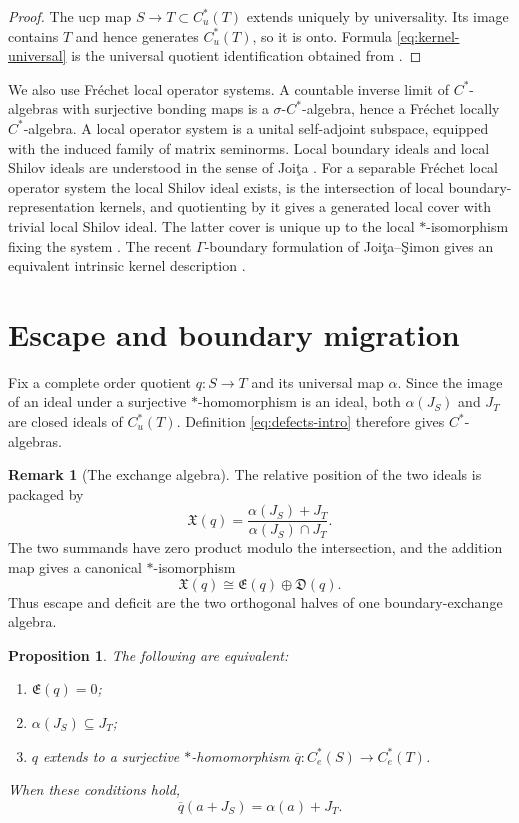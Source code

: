 \documentclass[11pt,a4paper]{amsart}
\theoremstyle{plain}
\newtheorem{proposition}[theorem]{Proposition}
\theoremstyle{definition}
\newtheorem{remark}[theorem]{Remark}
\newcommand{\Cu}{C_u^*}
\newcommand{\Ce}{C_e^*}
\newcommand{\Esc}{\mathfrak E}
\newcommand{\Def}{\mathfrak D}
\begin{document}
\begin{proof}
The ucp map $S\to T\subset\Cu(T)$ extends uniquely by universality.  Its image contains $T$ and
hence generates $\Cu(T)$, so it is onto.  Formula \eqref{eq:kernel-universal} is the universal
quotient identification obtained from \cite[Theorem~3.7 and Corollary~3.9]{KPTT2013}.
\end{proof}

We also use Fr\'echet local operator systems.  A countable inverse limit of $C^*$-algebras with
surjective bonding maps is a $\sigma$-$C^*$-algebra, hence a Fr\'echet locally $C^*$-algebra.
A local operator system is a unital self-adjoint subspace, equipped with the induced family of
matrix seminorms.  Local boundary ideals and local Shilov ideals are understood in the sense of
Joi\c{t}a \cite{Joita2025}.  For a separable Fr\'echet local operator system the local Shilov ideal
exists, is the intersection of local boundary-representation kernels, and quotienting by it gives
a generated local cover with trivial local Shilov ideal.  The latter cover is unique up to the
local $*$-isomorphism fixing the system \cite[Theorems~3.16 and~3.18]{Joita2025}.  The recent
$\Gamma$-boundary formulation of Joi\c{t}a--\c{S}imon gives an equivalent intrinsic kernel
description \cite{JoitaSimon2026}.

\section{Escape and boundary migration}\label{sec:defects}

Fix a complete order quotient $q:S\to T$ and its universal map $\alpha$.  Since the image of an
ideal under a surjective $*$-homomorphism is an ideal, both $\alpha(J_S)$ and $J_T$ are closed
ideals of $\Cu(T)$.  Definition \eqref{eq:defects-intro} therefore gives $C^*$-algebras.

\begin{remark}[The exchange algebra]\label{rem:exchange}
The relative position of the two ideals is packaged by
\[
 \mathfrak X(q)=\frac{\alpha(J_S)+J_T}{\alpha(J_S)\cap J_T}.
\]
The two summands have zero product modulo the intersection, and the addition map gives a canonical
$*$-isomorphism
\[
 \mathfrak X(q)\cong\Esc(q)\oplus\Def(q).
\]
Thus escape and deficit are the two orthogonal halves of one boundary-exchange algebra.
\end{remark}

\begin{proposition}\label{prop:escape-envelope}
The following are equivalent:
\begin{enumerate}[label=\textup{(\roman*)}]
\item $\Esc(q)=0$;
\item $\alpha(J_S)\subseteq J_T$;
\item $q$ extends to a surjective $*$-homomorphism
      $\overline q:\Ce(S)\to\Ce(T)$.
\end{enumerate}
When these conditions hold,
\begin{equation}\label{eq:envelope-map}
 \overline q(a+J_S)=\alpha(a)+J_T.
\end{equation}
\end{proposition}
\end{document}
